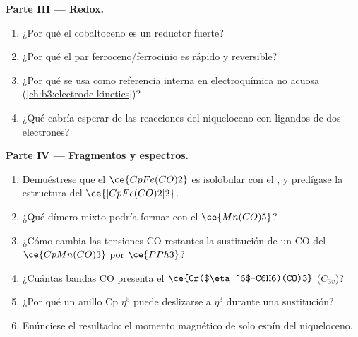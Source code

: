 \begin{problem}
\medskip\noindent\textbf{Parte III --- Redox.}
\begin{enumerate}[resume]
  \item ¿Por qué el cobaltoceno es un reductor fuerte?
  \item ¿Por qué el par ferroceno/ferrocinio es rápido y reversible?
  \item ¿Por qué se usa como referencia interna en electroquímica no acuosa
        (\cref{ch:b3:electrode-kinetics})?
  \item ¿Qué cabría esperar de las reacciones del niqueloceno con ligandos de dos
        electrones?
\end{enumerate}

\medskip\noindent\textbf{Parte IV --- Fragmentos y espectros.}
\begin{enumerate}[resume]
  \item Demuéstrese que el $\ce{CpFe(CO)2}$ es isolobular con el , y predígase la estructura del
        $\ce{[CpFe(CO)2]2}$.
  \item ¿Qué dímero mixto podría formar con el $\ce{Mn(CO)5}$?
  \item ¿Cómo cambia las tensiones CO restantes la sustitución de un CO del $\ce{CpMn(CO)3}$ por $\ce{PPh3}$?
  \item ¿Cuántas bandas CO presenta el $\ce{Cr($\eta^6$-C6H6)(CO)3}$ ($C_{3v}$)?
  \item ¿Por qué un anillo Cp $\eta^5$ puede deslizarse a $\eta^3$ durante una sustitución?
  \item Enúnciese el resultado: el momento magnético de solo espín del niqueloceno.
\end{enumerate}
\end{problem}
